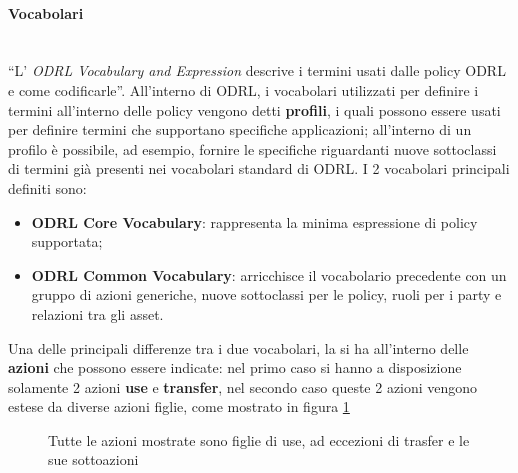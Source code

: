\documentclass[12pt,a4paper,twoside]{book}
\begin{document}
\paragraph{Vocabolari}\mbox{}\\
\label{profili}
``L' \textit{ODRL Vocabulary and Expression} descrive i termini usati dalle policy ODRL e come codificarle''\cite{ODRVocab}. All'interno di ODRL, i vocabolari utilizzati per definire i termini all'interno delle policy vengono detti \textbf{profili}, i quali possono essere usati per definire termini che supportano specifiche applicazioni; all'interno di un profilo è possibile, ad esempio, fornire le specifiche riguardanti nuove sottoclassi di termini già presenti nei vocabolari standard di ODRL. I 2 vocabolari principali definiti sono:
\begin{itemize}
	\item \textbf{ODRL Core Vocabulary}: rappresenta la minima espressione di policy supportata;
	\item \textbf{ODRL Common Vocabulary}: arricchisce il vocabolario precedente con un gruppo di azioni generiche, nuove sottoclassi per le policy, ruoli per i party e relazioni tra gli asset.
\end{itemize}
Una delle principali differenze tra i due vocabolari, la si ha all'interno delle \textbf{azioni} che possono essere indicate: nel primo caso si hanno a disposizione solamente 2 azioni \textbf{use} e \textbf{transfer}, nel secondo caso queste 2 azioni vengono estese da diverse azioni figlie, come mostrato in figura \ref{imgUseTransfer}

\begin{figure}[H]
	\centering
	\def\svgwidth{\columnwidth}
	
	\caption{Tutte le azioni mostrate sono figlie di use, ad eccezioni di trasfer e le sue sottoazioni\cite{ODRLBestPract}\label{imgUseTransfer}}
\end{figure}
\end{document}
